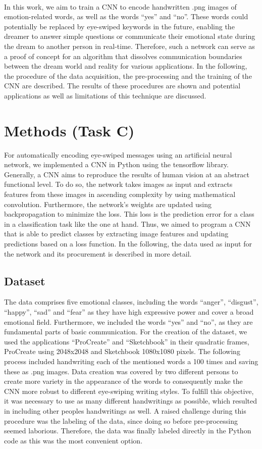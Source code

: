 \documentclass{article}
\begin{document}
\\
In this work, we aim to train a CNN to encode handwritten .png images of emotion-related words, as well as the words “yes” and “no”. These words could potentially be replaced by eye-swiped keywords in the future, enabling the dreamer to answer simple questions or communicate their emotional state during the dream to another person in real-time. Therefore, such a network can serve as a proof of concept for an algorithm that dissolves communication boundaries between the dream world and reality for various applications. In the following, the procedure of the data acquisition, the pre-processing and the training of the CNN are described. The results of these procedures are shown and potential applications as well as limitations of this technique are discussed.



\section{Methods (Task C)}
For automatically encoding eye-swiped messages using an artificial neural network, we implemented a CNN in Python using the tensorflow library. Generally, a CNN aims to reproduce the results of human vision at an abstract functional level. To do so, the network takes images as input and extracts features from these images in ascending complexity by using mathematical convolution. Furthermore, the network's weights are updated using backpropagation to minimize the loss. This loss is the prediction error for a class in a classification task like the one at hand. Thus, we aimed to program a CNN that is able to predict classes by extracting image features and updating predictions based on a loss function. In the following, the data used as input for the network and its procurement is described in more detail.

\subsection*{Dataset}
The data comprises five emotional classes, including the words “anger”, “disgust”, “happy”, “sad” and “fear” as they have high expressive power and cover a broad emotional field. Furthermore, we included the words “yes” and “no”, as they are fundamental parts of basic communication. For the creation of the dataset, we used the applications “ProCreate” and “Sketchbook” in their quadratic frames, ProCreate using 2048x2048 and Sketchbook 1080x1080 pixels. The following process included handwriting each of the mentioned words a 100 times and saving these as .png images. Data creation was covered by two different persons to create more variety in the appearance of the words to consequently make the CNN more robust to different eye-swiping writing styles. To fulfill this objective, it was necessary to use as many different handwritings as possible, which resulted in including other peoples handwritings as well. A raised challenge during this procedure was the labeling of the data, since doing so before pre-processing seemed laborious. Therefore, the data was finally labeled directly in the Python code as this was the most convenient option.
\end{document}
